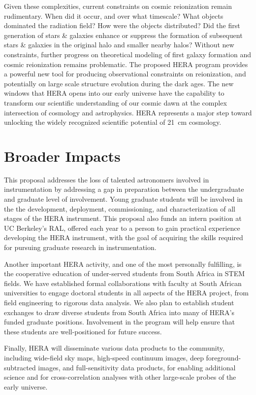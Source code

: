 \documentclass[preprint]{aastex}
\begin{document}
Given these complexities, current constraints on cosmic reionization remain rudimentary. When did it
occur, and over what timescale?  What objects dominated the radiation field?
How were the objects distributed? Did the first generation of stars \& galaxies
enhance or suppress the formation of subsequent stars \& galaxies in the
original halo and smaller nearby halos? Without new constraints, further
progress on theoretical modeling of first galaxy formation and cosmic
reionization remains problematic.  The proposed HERA program provides a
powerful new tool for producing observational constraints on reionization, and
potentially on large scale structure evolution during the dark ages.  The new
windows that HERA opens into our early universe have the capability to
transform our scientific understanding of our cosmic dawn at the complex intersection of cosmology
and astrophysics.  HERA represents a major step toward unlocking the widely recognized scientific potential of
21~cm cosmology.

\section*{Broader Impacts}

This proposal addresses the loss of talented astronomers involved in
instrumentation by addressing a gap in preparation between the undergraduate
and graduate level of involvement.  Young graduate students will be involved
in the the development,
deployment, commissioning, and characterization of all stages of the HERA
instrument. This proposal also funds an intern
position at UC Berkeley's RAL, offered each year to a person to gain
practical experience developing
the HERA instrument, with the goal of acquiring the skills required for
pursuing graduate research in instrumentation.

Another important HERA activity, and
one of the most personally fulfilling, is the cooperative education of
under-served students from South Africa in STEM fields.
We have established formal collaborations
with faculty at South African universities to engage doctoral students in all aspects of the HERA project, from
field engineering to rigorous data analysis. We also plan to establish
student exchanges to draw
diverse students from South Africa into many of HERA's funded graduate positions.
Involvement in the
program will help ensure that these students are well-positioned for
future success.

Finally, HERA will disseminate various data products to the community,
including wide-field sky maps, high-speed continuum images, deep
foreground-subtracted images, and full-sensitivity data products, for enabling
additional science and for cross-correlation analyses with other large-scale
probes of the early universe.
\end{document}
